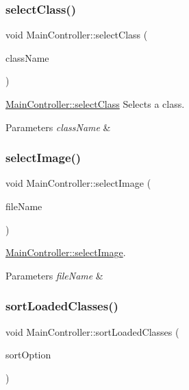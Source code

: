 \subsubsection{\texorpdfstring{select\+Class()}{selectClass()}}
{\footnotesize\ttfamily void Main\+Controller\+::select\+Class (\begin{DoxyParamCaption}\item[{const Q\+String \&}]{class\+Name }\end{DoxyParamCaption})}



\hyperlink{classMainController_aa2b2e86d0134c9bb413d74efdd926211}{Main\+Controller\+::select\+Class} Selects a class. 


\begin{DoxyParams}{Parameters}
{\em class\+Name} & \\
\hline
\end{DoxyParams}
\mbox{\label{classMainController_a528a8b9b2aeee5dd416dc1e57da56693}} 
\subsubsection{\texorpdfstring{select\+Image()}{selectImage()}}
{\footnotesize\ttfamily void Main\+Controller\+::select\+Image (\begin{DoxyParamCaption}\item[{const Q\+String \&}]{file\+Name }\end{DoxyParamCaption})}



\hyperlink{classMainController_a528a8b9b2aeee5dd416dc1e57da56693}{Main\+Controller\+::select\+Image}. 


\begin{DoxyParams}{Parameters}
{\em file\+Name} & \\
\hline
\end{DoxyParams}
\mbox{\label{classMainController_a21e18cb936861042e1603c029f3c006e}} 
\subsubsection{\texorpdfstring{sort\+Loaded\+Classes()}{sortLoadedClasses()}}
{\footnotesize\ttfamily void Main\+Controller\+::sort\+Loaded\+Classes (\begin{DoxyParamCaption}\item[{const Q\+String \&}]{sort\+Option }\end{DoxyParamCaption})}



